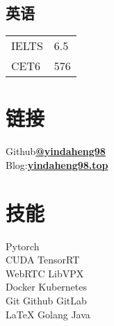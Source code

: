 \documentclass[]{deedy-resume-openfont}
\begin{document}
\begin{minipage}[t]{0.21\textwidth}
	\subsection{英语}
	\begin{tabular}{ll}
		IELTS & 6.5 \\
		CET6  & 576 \\
	\end{tabular}
	\sectionsep
    

	\section{链接}
	Github\href{https://github.com/yindaheng98}{\bf @yindaheng98} \\
	Blog:\href{http://www.yindaheng98.top}{\bf yindaheng98.top} \\
	\sectionsep

	\section{技能}
	Pytorch \\
	CUDA \textbullet{} TensorRT \\
	WebRTC \textbullet{} LibVPX \\
	Docker \textbullet{} Kubernetes \\
	Git \textbullet{} Github \textbullet{} GitLab \\
	\LaTeX \textbullet{} Golang \textbullet{} Java \\
	\sectionsep


\end{minipage}
\hfill
\end{document}
